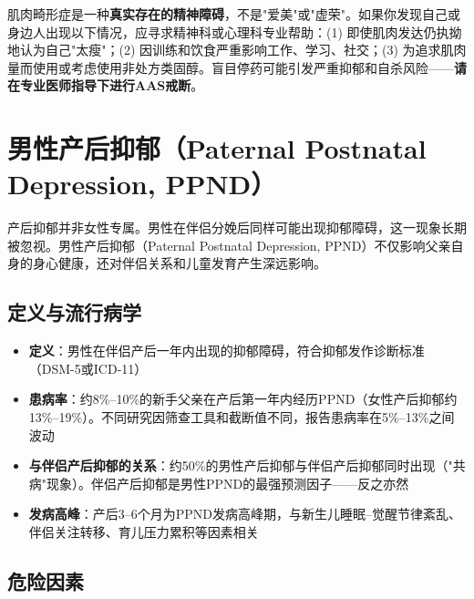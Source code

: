 \begin{tcolorbox}[colback=pink!5!white,colframe=red!50!black,title=贴心小叮咛]
肌肉畸形症是一种\textbf{真实存在的精神障碍}，不是"爱美"或"虚荣"。如果你发现自己或身边人出现以下情况，应寻求精神科或心理科专业帮助：(1) 即使肌肉发达仍执拗地认为自己"太瘦"；(2) 因训练和饮食严重影响工作、学习、社交；(3) 为追求肌肉量而使用或考虑使用非处方类固醇。盲目停药可能引发严重抑郁和自杀风险——\textbf{请在专业医师指导下进行AAS戒断}。
\end{tcolorbox}

\section{男性产后抑郁（Paternal Postnatal Depression, PPND）}

产后抑郁并非女性专属。男性在伴侣分娩后同样可能出现抑郁障碍，这一现象长期被忽视。男性产后抑郁（Paternal Postnatal Depression, PPND）不仅影响父亲自身的身心健康，还对伴侣关系和儿童发育产生深远影响。

\subsection{定义与流行病学}

\begin{itemize}[leftmargin=2cm]
	\item \textbf{定义}：男性在伴侣产后一年内出现的抑郁障碍，符合抑郁发作诊断标准（DSM-5或ICD-11）
	\item \textbf{患病率}：约8\%--10\%的新手父亲在产后第一年内经历PPND（女性产后抑郁约13\%--19\%）。不同研究因筛查工具和截断值不同，报告患病率在5\%--13\%之间波动
	\item \textbf{与伴侣产后抑郁的关系}：约50\%的男性产后抑郁与伴侣产后抑郁同时出现（"共病"现象）。伴侣产后抑郁是男性PPND的最强预测因子——反之亦然
	\item \textbf{发病高峰}：产后3--6个月为PPND发病高峰期，与新生儿睡眠--觉醒节律紊乱、伴侣关注转移、育儿压力累积等因素相关
\end{itemize}

\subsection{危险因素}

